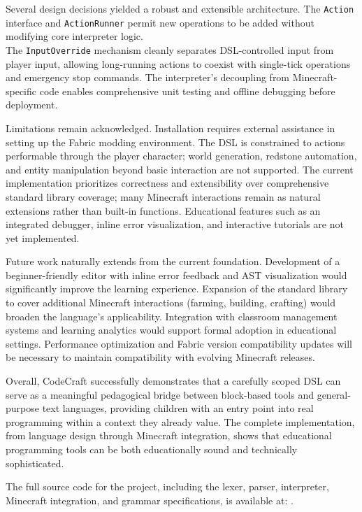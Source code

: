 Several design decisions yielded a robust and extensible architecture.
The \texttt{Action} interface and \texttt{ActionRunner} permit new operations to be added without modifying core interpreter logic. \\
The \texttt{InputOverride} mechanism cleanly separates DSL-controlled input from player input, allowing long-running actions to coexist with single-tick operations and emergency stop commands.
The interpreter's decoupling from Minecraft-specific code enables comprehensive unit testing and offline debugging before deployment.

Limitations remain acknowledged.
Installation requires external assistance in setting up the Fabric modding environment.
The DSL is constrained to actions performable through the player character; world generation, redstone automation, and entity manipulation beyond basic interaction are not supported.
The current implementation prioritizes correctness and extensibility over comprehensive standard library coverage; many Minecraft interactions remain as natural extensions rather than built-in functions.
Educational features such as an integrated debugger, inline error visualization, and interactive tutorials are not yet implemented.

Future work naturally extends from the current foundation.
Development of a beginner-friendly editor with inline error feedback and AST visualization would significantly improve the learning experience.
Expansion of the standard library to cover additional Minecraft interactions (farming, building, crafting) would broaden the language's applicability.
Integration with classroom management systems and learning analytics would support formal adoption in educational settings.
Performance optimization and Fabric version compatibility updates will be necessary to maintain compatibility with evolving Minecraft releases.

Overall, CodeCraft successfully demonstrates that a carefully scoped DSL can serve as a meaningful pedagogical bridge between block-based tools and general-purpose text languages, providing children with an entry point into real programming within a context they already value.
The complete implementation, from language design through Minecraft integration, shows that educational programming tools can be both educationally sound and technically sophisticated.

The full source code for the project, including the lexer, parser, interpreter, Minecraft integration, and grammar specifications, is available at: \cite{codecraft_github}.

